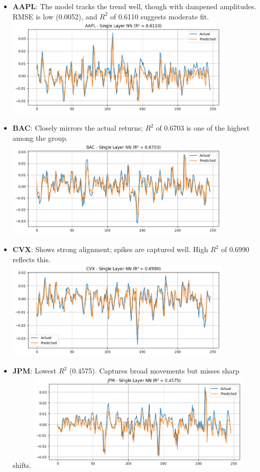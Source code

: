 \documentclass[12pt]{article}
\begin{document}
\begin{itemize}
  \item \textbf{AAPL}: The model tracks the trend well, though with dampened amplitudes. RMSE is low (0.0052), and $R^2$ of 0.6110 suggests moderate fit.
  \includegraphics[width=0.85\textwidth]{AAPL_single_layer_nn.png}

  \item \textbf{BAC}: Closely mirrors the actual returns; $R^2$ of 0.6703 is one of the highest among the group.
  \includegraphics[width=0.85\textwidth]{BAC_single_layer_nn.png}

  \item \textbf{CVX}: Shows strong alignment; spikes are captured well. High $R^2$ of 0.6990 reflects this.
  \includegraphics[width=0.85\textwidth]{CVX_single_layer_nn.png}

  \item \textbf{JPM}: Lowest $R^2$ (0.4575). Captures broad movements but misses sharp shifts.
  \includegraphics[width=0.85\textwidth]{JPM_single_layer_nn.png}


\end{itemize}
\end{document}
